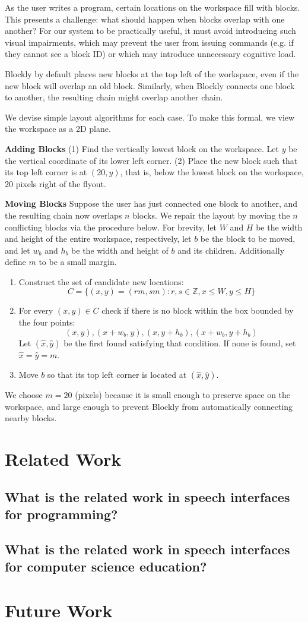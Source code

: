 \documentclass[]{article}
\begin{document}
As the user writes a program, certain locations on the workspace fill with blocks.
This presents a challenge: what should happen when blocks overlap with one another?
For our system to be practically useful, it must avoid introducing such visual impairments,
which may prevent the user from issuing commands (e.g. if they cannot see a block ID)
or which may introduce unnecessary cognitive load.

Blockly by default places new blocks at the top left of the workspace, even if the new block
will overlap an old block. Similarly, when Blockly connects one block to another, the resulting chain
might overlap another chain.

We devise simple layout algorithms for each case. To make this formal, we view
the workspace as a 2D plane.


\textbf{Adding Blocks} (1) Find the vertically lowest block on the workspace.
Let $y$ be the vertical coordinate of its lower left corner. (2) Place the new block
such that its top left corner is at $(20, y)$, that is, below the lowest block on the
workspace, 20 pixels right of the flyout.

\textbf{Moving Blocks} Suppose the user has just connected one block to another, and the
resulting chain now overlaps $n$ blocks. We repair the layout by moving the $n$ conflicting
blocks via the procedure below. For brevity, let $W$ and $H$ be the width and height of
the entire workspace, respectively, let $b$ be the block to be moved, and let
$w_b$ and $h_b$ be the width and height of $b$ and its children. Additionally define $m$
to be a small margin.
\begin{enumerate}
\item{Construct the set of candidate new locations: $$C = \{(x, y) = (rm, sm) : r, s \in \mathbb{Z}, x \le W, y \le H\}$$}
\item{For every $(x,y) \in C$ check if there is no block within the box bounded by the four points:
	$$(x,y), (x + w_b, y), (x, y + h_b), (x + w_b, y + h_b)$$
Let $(\hat{x}, \hat{y})$ be the first found satisfying that condition. If none is found, set $\hat{x} = \hat{y} = m$.
}
\item{Move $b$ so that its top left corner is located at $(\hat x, \hat y)$.}
\end{enumerate}
We choose $m = 20$ (pixels) because it is small enough to preserve space on the workspace,
and large enough to prevent Blockly from automatically connecting nearby blocks.

\section{Related Work}

\subsection{What is the related work in speech interfaces for programming?}

\subsection{What is the related work in speech interfaces for computer science education?}


\section{Future Work}
\end{document}
